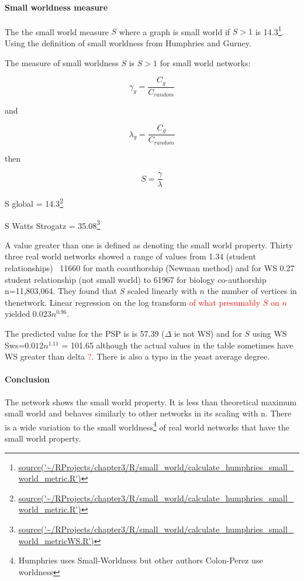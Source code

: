 \paragraph{Small worldness measure}
The the small world measure $S$ where a graph is small world if $S>1$ \cite{humphries2008network} is 14.3\footnote{\url{source('~/RProjects/chapter3/R/small_world/calculate_humphries_small_world_metric.R')}}.
Using the definition of small worldness from Humphries and Gurney.

The measure of small worldness $S$ is $S>1$ for small world networks:

\begin{equation}
    \gamma_g = \frac{C_g}{C_{random}}
\end{equation}

and

\begin{equation}
    \lambda_g = \frac{C_g}{C_{random}}
\end{equation}


then

\begin{equation}
    S = \frac{\gamma}{\lambda}
\end{equation}

S global =  14.3\footnote{\url{source('~/RProjects/chapter3/R/small_world/calculate_humphries_small_world_metric.R')}}

S Watts Strogatz = 35.08\footnote{\url{source('~/RProjects/chapter3/R/small_world/calculate_humphries_small_world_metricWS.R')}}

A value greater than one is defined as denoting the small world property\cite{humphries2008network}. Thirty three real world networks showed a range of values from   1.34 (student relationships) ~11660 for math coauthorship (Newman method)  and for WS 0.27 student relationship (not small world) to 61967 for biology co-authorship n=11,803,064. They found that $S$ scaled linearly with $n$ the number of vertices in thenetwork. Linear regression on the log transform \textcolor{red}{of what presumably $S$ on $n$} yielded $0.023n^{0.96}$.

The predicted value for the PSP is is 57.39 ($\Delta$ ie not WS) and for $S$ using WS Sws=$0.012n^{1.11}$ = 101.65 
although the actual values in the table sometimes have WS greater than delta \textcolor{red}{?}. There is also a typo in the yeast average degree. 


\paragraph{Conclusion} The network shows the small world property. It is less than theoretical maximum small world and behaves similarly to other networks in its scaling with n. There is a wide variation to the small worldness\footnote{Humphries uses Small-Worldness but other authors Colon-Perez use worldness} of real world networks that have the small world property. 



